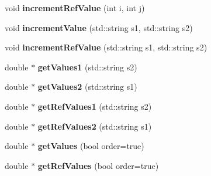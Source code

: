 \begin{DoxyCompactItemize}
\item 
\hypertarget{classDataset_a7326b8a0092ba1ebb44349c9eeb01440}{void {\bfseries increment\-Ref\-Value} (int i, int j)}\label{classDataset_a7326b8a0092ba1ebb44349c9eeb01440}

\item 
\hypertarget{classDataset_ab490e1dc5d017d6400a70f541f6c47ba}{void {\bfseries increment\-Value} (std\-::string s1, std\-::string s2)}\label{classDataset_ab490e1dc5d017d6400a70f541f6c47ba}

\item 
\hypertarget{classDataset_a5ec37adf418e434f06db698cd077f5b9}{void {\bfseries increment\-Ref\-Value} (std\-::string s1, std\-::string s2)}\label{classDataset_a5ec37adf418e434f06db698cd077f5b9}

\item 
\hypertarget{classDataset_a08bc430668dc243fde46b060745115b7}{double $\ast$ {\bfseries get\-Values1} (std\-::string s2)}\label{classDataset_a08bc430668dc243fde46b060745115b7}

\item 
\hypertarget{classDataset_af87c76f8b2f116d512af78e911e003cf}{double $\ast$ {\bfseries get\-Values2} (std\-::string s1)}\label{classDataset_af87c76f8b2f116d512af78e911e003cf}

\item 
\hypertarget{classDataset_a851bf5379def51280e64ea074f4334dd}{double $\ast$ {\bfseries get\-Ref\-Values1} (std\-::string s2)}\label{classDataset_a851bf5379def51280e64ea074f4334dd}

\item 
\hypertarget{classDataset_af70c89bf136f87b565495a2ac44dda69}{double $\ast$ {\bfseries get\-Ref\-Values2} (std\-::string s1)}\label{classDataset_af70c89bf136f87b565495a2ac44dda69}

\item 
\hypertarget{classDataset_aef2a876e783a9c7f802b63cb7a87aa9f}{double $\ast$ {\bfseries get\-Values} (bool order=true)}\label{classDataset_aef2a876e783a9c7f802b63cb7a87aa9f}

\item 
\hypertarget{classDataset_a4fe50eef91fe9730eb225859b8554512}{double $\ast$ {\bfseries get\-Ref\-Values} (bool order=true)}\label{classDataset_a4fe50eef91fe9730eb225859b8554512}

\end{DoxyCompactItemize}

